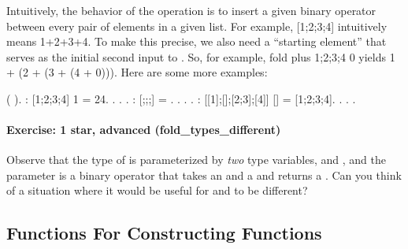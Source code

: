 \documentclass[12pt]{report}
\begin{document}
\subsubsection{ }



 Intuitively, the behavior of the  operation is to
    insert a given binary operator  between every pair of elements
    in a given list.  For example,    [1;2;3;4]  intuitively
    means 1+2+3+4.  To make this precise, we also need a ``starting
    element'' that serves as the initial second input to .  So, for
    example,
   fold plus 1;2;3;4 0
    yields
   1 + (2 + (3 + (4 + 0))).
    Here are some more examples:
\begin{coqdoccode}
\coqdocemptyline
\coqdocnoindent
{} ( ).\coqdoceol
\coqdocemptyline
\coqdocnoindent
{}  :   [1;2;3;4] 1 = 24.\coqdoceol
\coqdocnoindent
{}. . .\coqdoceol
\coqdocemptyline
\coqdocnoindent
{}  :   [;;;]  = .\coqdoceol
\coqdocnoindent
{}. . .\coqdoceol
\coqdocemptyline
\coqdocnoindent
{}  :    [[1];[];[2;3];[4]] [] = [1;2;3;4].\coqdoceol
\coqdocnoindent
{}. . .\coqdoceol
\coqdocemptyline
\end{coqdoccode}
\paragraph{Exercise: 1 star, advanced (fold\_types\_different)}

 Observe that the type of  is parameterized by \textit{two} type
    variables,  and , and the parameter  is a binary operator
    that takes an  and a  and returns a .  Can you think of a
    situation where it would be useful for  and  to be
    different? \begin{coqdoccode}
\coqdocemptyline
\end{coqdoccode}
\subsection{Functions For Constructing Functions}
\end{document}
